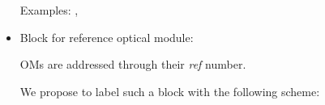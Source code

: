 \documentclass[12pt,a4paper]{article}
\begin{document}
\begin{itemize}
  \par\noindent Examples: , 
  
\item  Block for  reference  optical module:
  
  \par  OMs are  addressed  through their \emph{ref}  number.
  
  \par We propose to  label such a  block with the following scheme:
  \begin{center}
  \end{center}

\end{itemize}



\end{document}
